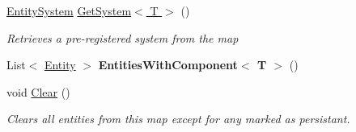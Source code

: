 \begin{DoxyCompactItemize}
\hyperlink{class_midnight_blue_1_1_engine_1_1_entity_component_1_1_entity_system}{Entity\+System} \hyperlink{class_midnight_blue_1_1_engine_1_1_entity_component_1_1_entity_map_ade1ba7fa7fd3e4e3d0610b9bd382587e}{Get\+System$<$ T $>$} ()
\begin{DoxyCompactList}\small\item\em Retrieves a pre-\/registered system from the map \end{DoxyCompactList}\item 
\hypertarget{class_midnight_blue_1_1_engine_1_1_entity_component_1_1_entity_map_a3065698e22aa421c98676d0316f67c12}{}\label{class_midnight_blue_1_1_engine_1_1_entity_component_1_1_entity_map_a3065698e22aa421c98676d0316f67c12} 
List$<$ \hyperlink{class_midnight_blue_1_1_engine_1_1_entity_component_1_1_entity}{Entity} $>$ {\bfseries Entities\+With\+Component$<$ T $>$} ()
\item 
void \hyperlink{class_midnight_blue_1_1_engine_1_1_entity_component_1_1_entity_map_af8b2220c70e42cd8e4802b744397ffcf}{Clear} ()
\begin{DoxyCompactList}\small\item\em Clears all entities from this map except for any marked as persistant. \end{DoxyCompactList}\end{DoxyCompactItemize}
